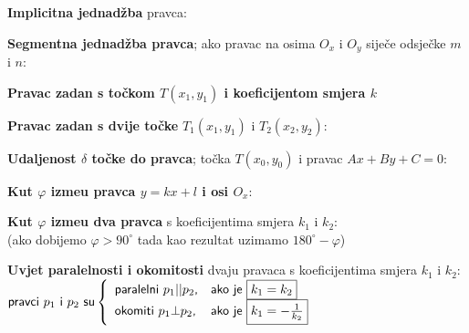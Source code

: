 \documentclass[9pt,oneside,a4paper]{report}
\begin{document}
\vspace{3mm}
\noindent \textbf{Implicitna jednad\v{z}ba} pravca:\hspace{5mm}

\vspace{3mm}
\noindent
\textbf{Segmentna jednad\v{z}ba pravca};
ako pravac na osima $O_x$ i $O_y$ sije\v{c}e odsje\v{c}ke $m$ i $n$: 
\hspace*{5mm}

\vspace{3mm}
\noindent
\textbf{Pravac zadan s to\v{c}kom $T(x_1,y_1)$ i koeficijentom smjera $k$} 
\hspace*{30mm} 

\vspace{3mm}
\noindent
\textbf{Pravac zadan s dvije to\v{c}ke} 
$T_1(x_1,y_1)$ i $T_2(x_2,y_2)$: \hspace{5mm}
\hspace{5mm}

\vspace{3mm}
\noindent
\textbf{Udaljenost $\delta$ to\v{c}ke do pravca}; to\v{c}ka $T(x_0,y_0)$ i
pravac $Ax+By+C=0$:
\hspace*{4mm}

\vspace{4mm}
\noindent \textbf{Kut $\varphi$ izme\dj{}u pravca $y=kx+l$ i osi $O_x$}: \hspace*{5mm}

\vspace{3mm}
\noindent \textbf{Kut $\varphi$ izme\dj{}u dva pravca} s koeficijentima
smjera $k_1$ i $k_2$:\\
\hspace*{30mm}\hspace{5mm} 
{\scriptsize (ako dobijemo $\varphi>90^\circ$ tada kao rezultat uzimamo
$180^\circ-\varphi$)}

\begin{floatingfigure}[r]{6cm}
\end{floatingfigure}

\vspace{3mm}
\noindent
\textbf{Uvjet paralelnosti i okomitosti} dvaju pravaca s koeficijentima
smjera $k_1$ i $k_2$:\\
\hspace*{5mm}$\displaystyle \textrm{\textsf{pravci $p_1$ i $p_2$ su}}\left\{
\begin{array}{ll}
	\textrm{\textsf{paralelni $p_1||p_2$,}} & \textrm{\textsf{ako je \fbox{$k_1=k_2$}}}\\
	\textrm{\textsf{okomiti $p_1\bot p_2$,}} & \textrm{\textsf{ako je
	\fbox{$k_1=-\frac 1{k_2}$}}}
\end{array} \right.$
\vspace{3mm}
\end{document}
